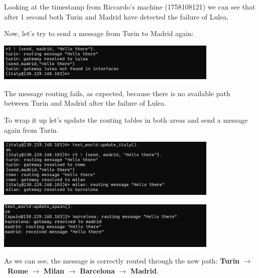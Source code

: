 \documentclass[a4paper, 11pt]{article}
\begin{document}
Looking at the timestamp from Riccardo's machine (1758108121) we can see that after 1 second both Turin and Madrid have detected the failure of Lulea.

Now, let's try to send a message from Turin to Madrid again:
\begin{center}
\includegraphics[width=0.8\textwidth]{screenshots/routing_failed.png}
\end{center}

The message routing fails, as expected, because there is no available path between Turin and Madrid after the failure of Lulea.

To wrap it up let's update the routing tables in both areas and send a message again from Turin.
\begin{center}
\includegraphics[width=0.8\textwidth]{screenshots/routing_resolved_to_barcelona.png}
\end{center}

\begin{center}
\includegraphics[width=0.8\textwidth]{screenshots/madrid_receives_from_turin.png}
\end{center}

As we can see, the message is correctly routed through the new path: \textbf{Turin} $\to$\ \textbf{Rome} $\to$ \textbf{Milan} $\to$ \textbf{Barcelona} $\to$ \textbf{Madrid}.
\end{document}
